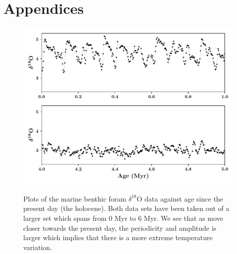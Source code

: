 \documentclass[12pt, onecolumn]{revtex4}    %
\begin{document}
\newpage





\newpage

\section*{Appendices}
\begin{figure}[!h]
\begin{center}
\includegraphics[width=15cm]{figures/foram_data}
\caption[]{Plots of the marine benthic foram $\delta^{18}$O data against age since the present day (the holocene). Both data sets have been taken out of a larger set which spans from 0 Myr to 6 Myr. We see that as move closer towards the present day, the periodicity and amplitude is larger which implies that there is a more extreme temperature variation.}
\vspace{-3ex}
\label{fig:foram_data}
\end{center}
\end{figure}
\end{document}
